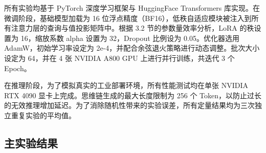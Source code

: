 所有实验均基于 PyTorch 深度学习框架与 HuggingFace Transformers 库实现。在微调阶段，基础模型加载为 16 位浮点精度（BF16），低秩自适应模块被注入到所有注意力层的查询与值投影矩阵中。根据 3.2 节的参数量效率分析，LoRA 的秩设置为 16，缩放系数 alpha 设置为 32，Dropout 比例设为 0.05。优化器选用 AdamW，初始学习率设定为 2e-4，并配合余弦退火策略进行动态调整。批次大小设定为 64，并在 4 张 NVIDIA A800 GPU 上进行并行训练，共迭代 3 个 Epoch。

在推理阶段，为了模拟真实的工业部署环境，所有性能测试均在单张 NVIDIA RTX 4090 显卡上完成。思维链生成的最大长度限制为 256 个 Token，以防止过长的无效推理增加延迟。为了消除随机性带来的实验误差，所有定量结果均为三次独立重复实验的平均值。

\subsection{主实验结果}


